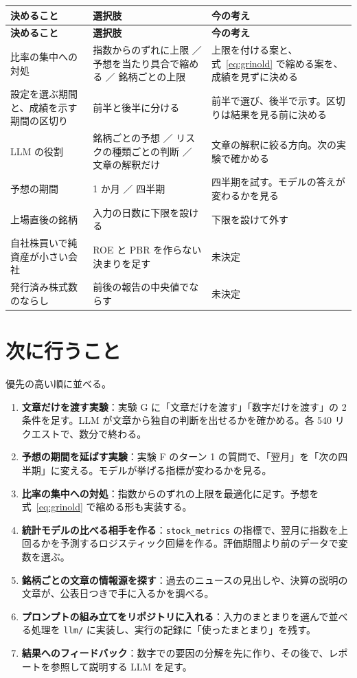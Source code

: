 \documentclass[xelatex,ja=standard,jafont=hiragino-pron,a4paper,10pt]{bxjsreport}
\newcommand{\code}[1]{\texttt{#1}}
\begin{document}
\begin{longtable}{p{4.60cm}p{5.00cm}p{4.80cm}}
\toprule
\textbf{決めること} & \textbf{選択肢} & \textbf{今の考え} \\
\midrule
\endfirsthead
\toprule
\textbf{決めること} & \textbf{選択肢} & \textbf{今の考え} \\
\midrule
\endhead
\bottomrule
\endfoot
比率の集中への対処 & 指数からのずれに上限 ／ 予想を当たり具合で縮める ／ 銘柄ごとの上限 & 上限を付ける案と、式~\eqref{eq:grinold} で縮める案を、成績を見ずに決める \\
設定を選ぶ期間と、成績を示す期間の区切り & 前半と後半に分ける & 前半で選び、後半で示す。区切りは結果を見る前に決める \\
LLM の役割 & 銘柄ごとの予想 ／ リスクの種類ごとの判断 ／ 文章の解釈だけ & 文章の解釈に絞る方向。次の実験で確かめる \\
予想の期間 & 1 か月 ／ 四半期 & 四半期を試す。モデルの答えが変わるかを見る \\
上場直後の銘柄 & 入力の日数に下限を設ける & 下限を設けて外す \\
自社株買いで純資産が小さい会社 & ROE と PBR を作らない決まりを足す & 未決定 \\
発行済み株式数のならし & 前後の報告の中央値でならす & 未決定 \\
\end{longtable}

\section{次に行うこと}

優先の高い順に並べる。

\begin{enumerate}
\item \textbf{文章だけを渡す実験}：実験 G に「文章だけを渡す」「数字だけを渡す」の 2 条件を足す。LLM が文章から独自の判断を出せるかを確かめる。各 540 リクエストで、数分で終わる。
\item \textbf{予想の期間を延ばす実験}：実験 F のターン 1 の質問で、「翌月」を「次の四半期」に変える。モデルが挙げる指標が変わるかを見る。
\item \textbf{比率の集中への対処}：指数からのずれの上限を最適化に足す。予想を式~\eqref{eq:grinold} で縮める形も実装する。
\item \textbf{統計モデルの比べる相手を作る}：\code{stock\_metrics} の指標で、翌月に指数を上回るかを予測するロジスティック回帰を作る。評価期間より前のデータで変数を選ぶ。
\item \textbf{銘柄ごとの文章の情報源を探す}：過去のニュースの見出しや、決算の説明の文章が、公表日つきで手に入るかを調べる。
\item \textbf{プロンプトの組み立てをリポジトリに入れる}：入力のまとまりを選んで並べる処理を \code{llm/} に実装し、実行の記録に「使ったまとまり」を残す。
\item \textbf{結果へのフィードバック}：数字での要因の分解を先に作り、その後で、レポートを参照して説明する LLM を足す。
\end{enumerate}
\end{document}
